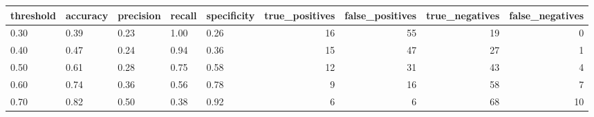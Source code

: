 \begin{tabular}{lllllrrrr}
\toprule
threshold & accuracy & precision & recall & specificity & true\_positives & false\_positives & true\_negatives & false\_negatives \\
\midrule
0.30 & 0.39 & 0.23 & 1.00 & 0.26 & 16 & 55 & 19 & 0 \\
0.40 & 0.47 & 0.24 & 0.94 & 0.36 & 15 & 47 & 27 & 1 \\
0.50 & 0.61 & 0.28 & 0.75 & 0.58 & 12 & 31 & 43 & 4 \\
0.60 & 0.74 & 0.36 & 0.56 & 0.78 & 9 & 16 & 58 & 7 \\
0.70 & 0.82 & 0.50 & 0.38 & 0.92 & 6 & 6 & 68 & 10 \\
\bottomrule
\end{tabular}
